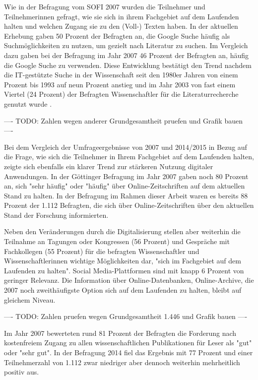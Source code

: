 Wie in der Befragung vom SOFI 2007 wurden die Teilnehmer und Teilnehmerinnen gefragt, wie sie sich in ihrem Fachgebiet auf dem Laufenden halten und welchen Zugang sie zu den (Voll-) Texten haben. In der aktuellen Erhebung gaben 50 Prozent der Befragten an, die Google Suche häufig als Suchmöglichkeiten zu nutzen, um gezielt nach Literatur zu suchen. Im Vergleich dazu gaben bei der Befragung im Jahr 2007 46 Prozent der Befragten an, häufig die Google Suche zu verwenden. Diese Entwicklung bestätigt den Trend nachdem die IT-gestützte Suche in der Wissenschaft seit den 1980er Jahren von einem Prozent bis 1993 auf neun Prozent anstieg und im Jahr 2003 von fast einem Viertel (24 Prozent) der Befragten Wissenschaftler für die Literaturrecherche genutzt wurde \cite{hanekop_2008}.

---- TODO: Zahlen wegen anderer Grundgesamtheit pruefen und Grafik bauen ----

Bei dem Vergleich der Umfrageergebnisse von 2007 und 2014/2015 in Bezug auf die Frage, wie sich die Teilnehmer in Ihrem Fachgebiet auf dem Laufenden halten, zeigte sich ebenfalls ein klarer Trend zur stärkeren Nutzung digitaler Anwendungen. In der Göttinger Befragung im Jahr 2007 gaben noch 80 Prozent an, sich "sehr häufig" oder "häufig" über Online-Zeitschriften auf dem aktuellen Stand zu halten. In der Befragung im Rahmen dieser Arbeit waren es bereits 88 Prozent der 1.112 Befragten, die sich über Online-Zeitschriften über den aktuellen Stand der Forschung informierten.

Neben den Veränderungen durch die Digitalisierung stellen aber weiterhin die Teilnahme an Tagungen oder Kongressen (56 Prozent) und Gespräche mit Fachkollegen (55 Prozent) für die befragten Wissenschaftler und Wissenschaftlerinnen wichtige Möglichkeiten dar, "sich im Fachgebiet auf dem Laufenden zu halten". Social Media-Plattformen sind mit knapp 6 Prozent von geringer Relevanz. Die Information über Online-Datenbanken, Online-Archive, die 2007 noch zweithäufigste Option sich auf dem Laufenden zu halten, bleibt auf gleichem Niveau.

---- TODO: Zahlen pruefen wegen Grundgesamtheit 1.446 und Grafik bauen ----

Im Jahr 2007 bewerteten rund 81 Prozent der Befragten die Forderung nach kostenfreiem Zugang zu allen wissenschaftlichen Publikationen für Leser als "gut" oder "sehr gut". In der Befragung 2014 fiel das Ergebnis mit 77 Prozent und einer Teilnehmerzahl von 1.112 zwar niedriger aber dennoch weiterhin mehrheitlich positiv aus.

